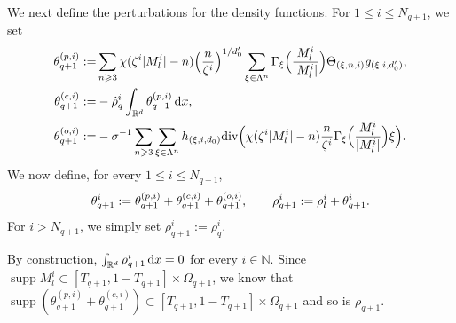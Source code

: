 \documentclass[UTF-8,reqno]{amsart}
\numberwithin{equation}{section}
\theoremstyle{definition}
\DeclareMathOperator{\supp}{supp}
\def\dif{{\mathord{{\rm d}}}}
\def\geq{\geqslant}
\def\leq{\leqslant}
\def\div{\mathord{{\rm div}}}
\def\dif{{\mathord{{\rm d}}}}
\def\geq{\geqslant}
\def\leq{\leqslant}
\def\div{\mathord{{\rm div}}}
\begin{document}
We next define the perturbations for the density functions. 
For $1\leq i\leq N_{q+1}$, we set
\begin{align}
\theta_{q+1}^{(p,i)}
:=
&\sum_{n\geq3}
\chi(\zeta^i|M_l^i|-n)
\Bigl(\frac{n}{\zeta^i}\Bigr)^{1/d_0'}
\sum_{\xi\in\Lambda^n}
\Gamma_\xi\Bigl(\frac{M_l^i}{|M_l^i|}\Bigr)
\Theta_{(\xi,n,i)}
g_{(\xi,i,d_0')},
\notag\\
\theta_{q+1}^{(c,i)}
:=
&-\hat{\rho}^i_q
\int_{\mathbb{R}^d}
\theta_{q+1}^{(p,i)}\,\dif x,
\notag\\
\theta_{q+1}^{(o,i)}
:=
&-
\sigma^{-1}
\sum_{n\geq3}
\sum_{\xi\in\Lambda^n}
h_{(\xi,i,d_0)}
\div\Bigl(
\chi(\zeta^i|M_l^i|-n)
\frac{n}{\zeta^i}
\Gamma_\xi\Bigl(\frac{M_l^i}{|M_l^i|}\Bigr)
\xi
\Bigr).
\notag
\end{align}
We now define, for every $1\leq i\leq N_{q+1}$,
\begin{align}
\theta_{q+1}^i
:=
\theta_{q+1}^{(p,i)}
+
\theta_{q+1}^{(c,i)}
+
\theta_{q+1}^{(o,i)},
\qquad
\rho_{q+1}^i
:=
\rho_l^i+\theta_{q+1}^i.
\notag
\end{align}
For $i>N_{q+1}$, we simply set
$
\rho_{q+1}^i:=\rho_q^i.
$

By construction,
$
\int_{\mathbb{R}^d}\rho_{q+1}^i\,\dif x=0
$
for every $i\in\mathbb{N}$.
Since $\supp M_l^i\subset [T_{q+1},1-T_{q+1}]\times\Omega_{q+1}$, we know that $\supp (\theta_{q+1}^{(p,i)}+\theta_{q+1}^{(c,i)})\subset[T_{q+1},1-T_{q+1}]\times\Omega_{q+1}$ and so is $\rho_{q+1}$. 
 
\end{document}
